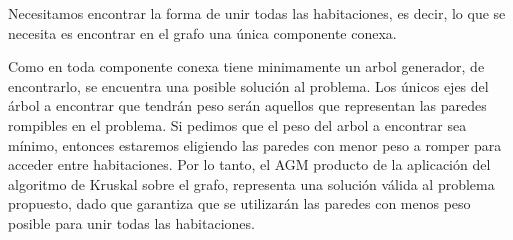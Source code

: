 Necesitamos encontrar la forma de unir todas las habitaciones, es decir, lo que se necesita es encontrar en el grafo una única componente conexa. 

Como en toda componente conexa tiene minimamente un arbol generador, de encontrarlo, se encuentra una posible solución al problema. Los únicos ejes del árbol a encontrar que tendrán peso serán aquellos que representan las paredes rompibles en el problema. Si pedimos que el peso del arbol a encontrar sea mínimo, entonces estaremos eligiendo las paredes con menor peso a romper para acceder entre habitaciones. Por lo tanto, el AGM producto de la aplicación del algoritmo de Kruskal sobre el grafo, representa una solución válida al problema propuesto, dado que garantiza que se utilizarán las paredes con menos peso posible para unir todas las habitaciones.